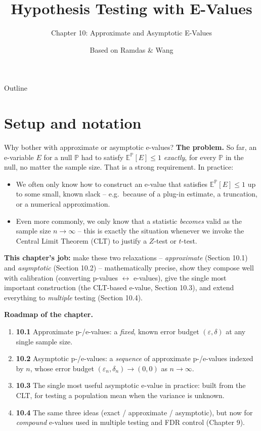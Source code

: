 \documentclass[aspectratio=169,10pt]{beamer}
\title[E-Values -- Ch.10]{Hypothesis Testing with E-Values}
\subtitle{Chapter 10: Approximate and Asymptotic E-Values}
\author{Based on Ramdas \& Wang}
\date{}
\newcommand{\E}{\mathbb{E}}
\newcommand{\Pb}{\mathbb{P}}
\begin{document}
\begin{frame}
  \titlepage
\end{frame}

\begin{frame}[allowframebreaks]{Outline}
  \tableofcontents
\end{frame}

\section{Setup and notation}

\begin{frame}[allowframebreaks]{Why bother with approximate or asymptotic e-values?}
  \textbf{The problem.} So far, an e-variable $E$ for a null $\Pb$ had to satisfy $\E^{\Pb}[E] \leq 1$ \emph{exactly}, for every $\Pb$ in the null, no matter the sample size. That is a strong requirement. In practice:
  \begin{itemize}
    \item We often only know how to construct an e-value that satisfies $\E^{\Pb}[E]\leq 1$ up to some small, known slack -- e.g.\ because of a plug-in estimate, a truncation, or a numerical approximation.
    \item Even more commonly, we only know that a statistic \emph{becomes} valid as the sample size $n \to \infty$ -- this is exactly the situation whenever we invoke the Central Limit Theorem (CLT) to justify a $Z$-test or $t$-test.
  \end{itemize}

  \vspace{0.2cm}
  \textbf{This chapter's job:} make these two relaxations -- \emph{approximate} (Section 10.1) and \emph{asymptotic} (Section 10.2) -- mathematically precise, show they compose well with calibration (converting p-values $\leftrightarrow$ e-values), give the single most important construction (the CLT-based e-value, Section 10.3), and extend everything to \emph{multiple} testing (Section 10.4).

  \framebreak

  \textbf{Roadmap of the chapter.}
  \begin{enumerate}
    \item \textbf{10.1} Approximate p-/e-values: a \emph{fixed}, known error budget $(\varepsilon,\delta)$ at any single sample size.
    \item \textbf{10.2} Asymptotic p-/e-values: a \emph{sequence} of approximate p-/e-values indexed by $n$, whose error budget $(\varepsilon_n,\delta_n) \to (0,0)$ as $n\to\infty$.
    \item \textbf{10.3} The single most useful asymptotic e-value in practice: built from the CLT, for testing a population mean when the variance is unknown.
    \item \textbf{10.4} The same three ideas (exact / approximate / asymptotic), but now for \emph{compound} e-values used in multiple testing and FDR control (Chapter 9).
  \end{enumerate}
\end{frame}
\end{document}
